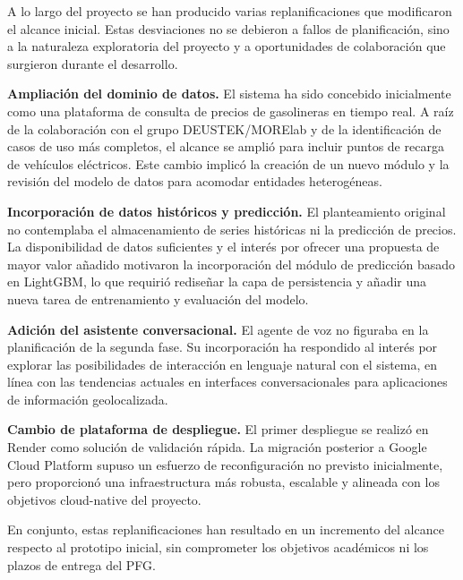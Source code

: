 A lo largo del proyecto se han producido varias replanificaciones que modificaron el alcance
inicial. Estas desviaciones no se debieron a fallos de planificación,
sino a la naturaleza exploratoria del proyecto y a oportunidades de colaboración que surgieron
durante el desarrollo.

\textbf{Ampliación del dominio de datos.} El sistema ha sido concebido inicialmente como una
plataforma de consulta de precios de gasolineras en tiempo real. A raíz de la colaboración
con el grupo DEUSTEK/MORElab \cite{MORElab2026} y de la identificación de casos de uso más completos, el alcance se amplió para
incluir puntos de recarga de vehículos eléctricos. Este cambio implicó la creación de un nuevo
módulo y la revisión del modelo de datos para acomodar entidades heterogéneas.

\textbf{Incorporación de datos históricos y predicción.} El planteamiento original no
contemplaba el almacenamiento de series históricas ni la predicción de precios. La disponibilidad
de datos suficientes y el interés por ofrecer una propuesta de mayor valor añadido motivaron
la incorporación del módulo de predicción basado en LightGBM, lo que requirió rediseñar la
capa de persistencia y añadir una nueva tarea de entrenamiento y evaluación del modelo.

\textbf{Adición del asistente conversacional.} El agente de voz no figuraba en
la planificación de la segunda fase. Su incorporación ha respondido al interés por explorar las
posibilidades de interacción en lenguaje natural con el sistema, en línea con las tendencias
actuales en interfaces conversacionales para aplicaciones de información geolocalizada.

\textbf{Cambio de plataforma de despliegue.} El primer despliegue se realizó en Render como
solución de validación rápida. La migración posterior a Google Cloud Platform supuso un
esfuerzo de reconfiguración no previsto inicialmente, pero proporcionó una infraestructura más
robusta, escalable y alineada con los objetivos cloud-native del proyecto.

En conjunto, estas replanificaciones han resultado en un incremento del alcance respecto al
prototipo inicial, sin comprometer los objetivos académicos ni los plazos de entrega del PFG.